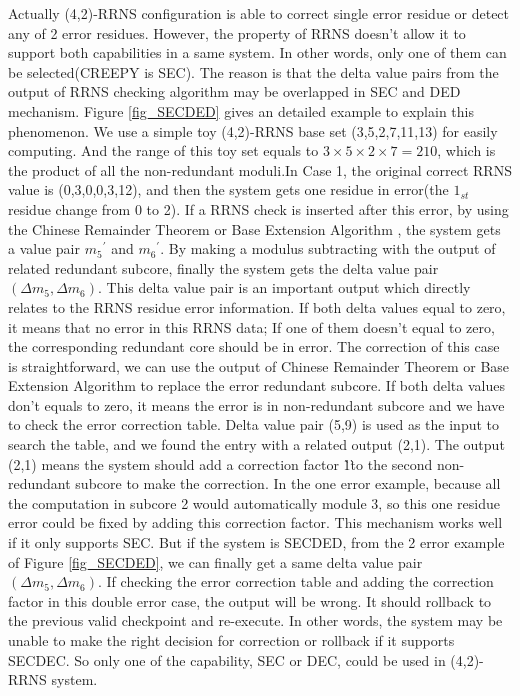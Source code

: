 \documentclass{sig-alternate}
\begin{document}
Actually (4,2)-RRNS configuration is able to correct single error residue or detect any of 2 error residues. However, the property of RRNS doesn't allow it to support both capabilities in a same system. In other words, only one of them can be selected(CREEPY is SEC).  The reason is that the delta value pairs from the output of RRNS checking algorithm may be overlapped in SEC and DED mechanism.  Figure \ref{fig_SECDED} gives an detailed example to explain this phenomenon. We use a simple toy (4,2)-RRNS base set (3,5,2,7,11,13) for easily computing. And the range of this toy set equals to $3 \times 5 \times 2 \times 7 = 210$, which is the product of all the non-redundant moduli.In Case 1, the original correct RRNS value is (0,3,0,0,3,12), and then the system gets one residue in error(the $1_{st}$ residue change from 0 to 2). If a RRNS check is inserted after this error, by using the Chinese Remainder Theorem\cite{goldreich1999chinese} or Base Extension Algorithm \cite{WatsonHastings,WatsonThesis}, the system gets a value pair ${m_{5}}^{'}$ and ${m_{6}}^{'}$. By making a modulus subtracting with the output of related redundant subcore, finally the system gets the delta value pair $(\Delta m_{5}, \Delta m_{6})$. This delta value pair is an important output which directly relates to the RRNS residue error information. If both delta values equal to zero, it means that no error in this RRNS data; If one of them doesn't equal to zero, the corresponding redundant core should be in error. The correction of this case is straightforward, we can use the output of Chinese Remainder Theorem or Base Extension Algorithm to replace the error redundant subcore. If both delta values don't equals to zero, it means the error is in non-redundant subcore and we have to check the error correction table. Delta value pair (5,9) is used as the input to search the table, and we found the entry with a related output (2,1). The output (2,1) means the system should add a correction factor \`1\` to the second non-redundant subcore to make the correction.  In the one error example, because  all the computation  in subcore 2 would automatically module 3, so this one residue error could be fixed by adding this correction factor. This mechanism works well if it only supports SEC. But if the system is SECDED, from the 2 error example of  Figure \ref{fig_SECDED}, we can finally get a same delta value pair $(\Delta m_{5}, \Delta m_{6})$. If checking the error correction table and adding the correction factor in this double error case, the output will be wrong. It should rollback to the previous valid checkpoint and re-execute. In other words, the system may be unable to make the right decision for correction or rollback if it supports SECDEC. So only one of the capability, SEC or DEC, could be used in (4,2)-RRNS system.  
\end{document}
